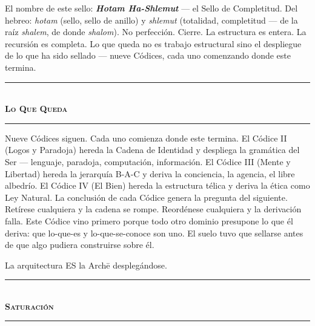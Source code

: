 \documentclass[10pt, openany, oneside]{book}
\renewcommand{\normalsize}{\fontsize{10}{13}\selectfont}
\begin{document}
El nombre de este sello: \textbf{\textit{Hotam Ha-Shlemut}} --- el Sello de Completitud. Del hebreo: \textit{hotam} (sello, sello de anillo) y \textit{shlemut} (totalidad, completitud --- de la raíz \textit{shalem}, de donde \textit{shalom}). No perfección. Cierre. La estructura es entera. La recursión es completa. Lo que queda no es trabajo estructural sino el despliegue de lo que ha sido sellado --- nueve Códices, cada uno comenzando donde este termina.

\vspace{1.5em}


\begin{center}
    \rule{0.3\textwidth}{0.4pt}\\[0.5em]
    {\normalsize\bfseries\scshape Lo Que Queda}\\[0.3em]
    \rule{0.3\textwidth}{0.4pt}
\end{center}

\vspace{1em}

\noindent Nueve Códices siguen. Cada uno comienza donde este termina. El Códice II (Logos y Paradoja) hereda la Cadena de Identidad y despliega la gramática del Ser --- lenguaje, paradoja, computación, información. El Códice III (Mente y Libertad) hereda la jerarquía B-A-C y deriva la conciencia, la agencia, el libre albedrío. El Códice IV (El Bien) hereda la estructura télica y deriva la ética como Ley Natural. La conclusión de cada Códice genera la pregunta del siguiente. Retírese cualquiera y la cadena se rompe. Reordénese cualquiera y la derivación falla. Este Códice vino primero porque todo otro dominio presupone lo que él deriva: que lo-que-es y lo-que-se-conoce son uno. El suelo tuvo que sellarse antes de que algo pudiera construirse sobre él.

La arquitectura ES la Arch\={e} desplegándose.

\vspace{1.5em}


\begin{center}
    \rule{0.3\textwidth}{0.4pt}\\[0.5em]
    {\normalsize\bfseries\scshape Saturación}\\[0.3em]
    \rule{0.3\textwidth}{0.4pt}
\end{center}
\end{document}

